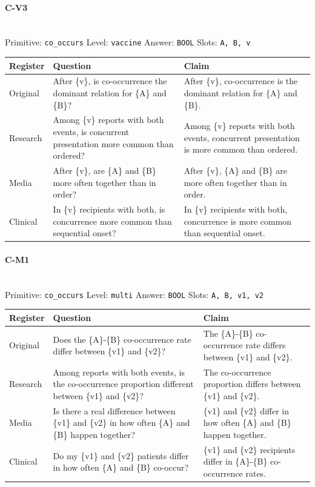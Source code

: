 \documentclass[11pt]{article}
\begin{document}
\paragraph{\textbf{C-V3}}\mbox{}\\
Primitive: \texttt{co\_occurs} \quad Level: \texttt{vaccine} \quad Answer: \texttt{BOOL} \quad Slots: \texttt{A, B, v}\\[2pt]
\begin{tabularx}{\linewidth}{@{}l L L@{}}
\toprule
\textbf{Register} & \textbf{Question} & \textbf{Claim} \\
\midrule
Original & After \{v\}, is co-occurrence the dominant relation for \{A\} and \{B\}? & After \{v\}, co-occurrence is the dominant relation for \{A\} and \{B\}. \\
Research & Among \{v\} reports with both events, is concurrent presentation more common than ordered? & Among \{v\} reports with both events, concurrent presentation is more common than ordered. \\
Media & After \{v\}, are \{A\} and \{B\} more often together than in order? & After \{v\}, \{A\} and \{B\} are more often together than in order. \\
Clinical & In \{v\} recipients with both, is concurrence more common than sequential onset? & In \{v\} recipients with both, concurrence is more common than sequential onset. \\
\bottomrule
\end{tabularx}
\vspace{4pt}

\paragraph{\textbf{C-M1}}\mbox{}\\
Primitive: \texttt{co\_occurs} \quad Level: \texttt{multi} \quad Answer: \texttt{BOOL} \quad Slots: \texttt{A, B, v1, v2}\\[2pt]
\begin{tabularx}{\linewidth}{@{}l L L@{}}
\toprule
\textbf{Register} & \textbf{Question} & \textbf{Claim} \\
\midrule
Original & Does the \{A\}-\{B\} co-occurrence rate differ between \{v1\} and \{v2\}? & The \{A\}-\{B\} co-occurrence rate differs between \{v1\} and \{v2\}. \\
Research & Among reports with both events, is the co-occurrence proportion different between \{v1\} and \{v2\}? & The co-occurrence proportion differs between \{v1\} and \{v2\}. \\
Media & Is there a real difference between \{v1\} and \{v2\} in how often \{A\} and \{B\} happen together? & \{v1\} and \{v2\} differ in how often \{A\} and \{B\} happen together. \\
Clinical & Do my \{v1\} and \{v2\} patients differ in how often \{A\} and \{B\} co-occur? & \{v1\} and \{v2\} recipients differ in \{A\}-\{B\} co-occurrence rates. \\
\bottomrule
\end{tabularx}
\vspace{4pt}
\end{document}
